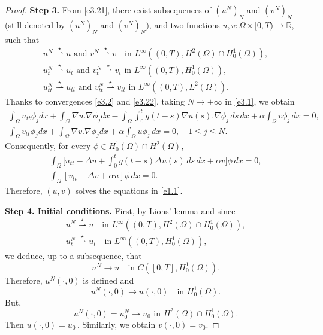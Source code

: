 \begin{proof}
\noindent\textbf{Step 3.}
From \eqref{e3.21}, there exist subsequences of $(u^{N})_{N}$ and $(v^{N})_{N}$
(still denoted by $(u^{N})_{N}$ and $(v^{N})_{N})$, and two functions
$u, v : \Omega \times [0, T) \to \mathbb{R}$, such that
\begin{equation}
\begin{gathered}
u^{N} \overset{\star}{\rightharpoonup} u \text{ and }
 v^{N} \overset{\star}{\rightharpoonup} v \quad \text{in }
 L^\infty((0,T), H^2(\Omega) \cap H_0^1 (\Omega)), \\
u_{t}^{N} \overset{\star}{\rightharpoonup} u_{t} \text{ and }
 v_{t}^{N} \overset{\star}{\rightharpoonup} v_{t} \text{ in } L^\infty((0,T),
 H^1_0(\Omega)), \\
 u_{tt}^{N} \overset{\star}{\rightharpoonup} u_{tt} \text{ and }
 v_{tt}^{N} \overset{\star}{\rightharpoonup} v_{tt} \text{ in }
 L^\infty((0,T), L^2(\Omega)).
\end{gathered}\label{e3.22}
\end{equation}
Thanks to convergences \eqref{e3.2} and \eqref{e3.22}, taking $N \to +\infty$
in \eqref{e3.1}, we obtain
\begin{equation}
\begin{gathered}
\int_\Omega u_{tt}\phi_j dx + \int_\Omega \nabla u .\nabla \phi_j dx
- \int_\Omega \int_0^t g(t-s) \nabla u(s) .\nabla \phi_j\, ds\, dx
+ \alpha \int_\Omega v \phi_j \, dx = 0,\\
\int_\Omega v_{tt} \phi_j dx + \int_\Omega \nabla v.\nabla \phi_j dx
+ \alpha \int_\Omega u \phi_j \, dx = 0,\quad 1\leq j\leq N.
\end{gathered} \label{e3.23}
\end{equation}
 Consequently, for every $ \phi \in H_0^1(\Omega)\cap H^2(\Omega)$,
\begin{gather*}
\int_\Omega \Big[ u_{tt}- \Delta u + \int_0^t g(t-s) \Delta u(s)\, ds\,dx
 + \alpha v\Big] \phi \, dx = 0,\\
\int_\Omega [ v_{tt} - \Delta v + \alpha u] \phi \, dx = 0.
\end{gather*}
Therefore, $(u,v)$ solves the equations in \eqref{e1.1}.
\smallskip

\noindent\textbf{Step 4. Initial conditions.}
First, by Lions' lemma \cite{Lions} and since
\begin{gather*}
u^{N} \overset{\star}{\rightharpoonup} u \quad \text{in }
 L^\infty((0,T), H^2(\Omega) \cap H_0^1 (\Omega)), \\
u_{t}^{N} \overset{\star}{\rightharpoonup} u_{t} \quad \text{in }
 L^\infty((0,T), H^1_0(\Omega)),
\end{gather*}
we deduce, up to a subsequence, that
\begin{equation}
u^{N} \to u \quad \text{in } C([0, T], H^1_0(\Omega)).\label{e3.24}
\end{equation}
Therefore, \( u^{N}(\cdot, 0) \) is defined and
\[
u^{N}(\cdot, 0) \to u(\cdot, 0) \quad \text{in } H^1_0(\Omega).
\]
But,
\[ u^{N}(\cdot, 0) = u^{N}_0 \to u_0 \,\, \text{in}\,\, H^2(\Omega) \cap H^1_0(\Omega).\] Then \( u(\cdot, 0) = u_0 \, \). Similarly, we obtain $v(\cdot, 0)=v_0. $


\end{proof}
